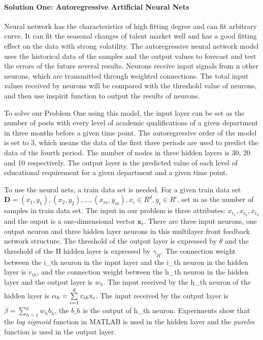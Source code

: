 \documentclass{mcmthesis}
\begin{document}
\paragraph{Solution One: Autoregressive Artificial Neural Nets }
\par\noindent
\par\noindent
Neural network has the characteristics of high fitting degree and can fit arbitrary curve. It can fit the seasonal changes of talent market well and has a good fitting effect on the data with strong volatility. The autoregressive neural network model uses the historical data of the samples and the output values to forecast and test the errors of the future several results. Neurons receive input signals from n other neurons, which are transmitted through weighted connections. The total input values received by neurons will be compared with the threshold value of neurons, and then use inspirit function to output the results of neurons. \par\noindent
To solve our Problem One using this model, the input layer can be set as the number of posts with every level of academic qualifications of a given department in three months before a given time point. The autoregressive order of the model is set to 3, which means the data of the first three periods are used to predict the data of the fourth period. The number of nodes in three hidden layers is 30, 20 and 10 respectively. The output layer is the predicted value of each level of educational requirement for a given department and a given time point.
\par\noindent
To use the neural nets, a train data set is needed.
For a given train data set $ \textbf{D} ={(x_1,y_1),(x_2,y_2),...,(x_m,y_m)},x_i \in R^d, y_i \in R^i$, set m as the number of samples in train data set. The input in our problem is three attributes: $x_{t_1},x_{t_2},x_{t_3}$ and the ouput is a one-dimensional vector $\textbf{x}_t$. There are three input neurons, one output neuron and three hidden layer neurons in this multilayer front feedback network structure. The threshold of the output layer is expressed by $\theta$ and the threshold of the H hidden layer is expressed by $\gamma_H$. The connection weight between the i\_th neuron in the input layer and the i\_th neuron in the hidden layer is $v_{ih}$, and the connection weight between the h\_th neuron in the hidden layer and the output layer is $w_h$. The input received by the h\_th neuron of the hidden layer is $\alpha_h = \sum\limits_{i = 1}^d {{v_{ih}}{{\rm{x}}_i}}$. The input received by the output layer is $\beta  = \sum\limits_{h = 1}^q {{w_h}{b_h}}$, the $b\_h$ is the output of h\_th neuron. Experiments show that the \textit{log sigmoid} function in MATLAB is used in the hidden layer and the \textit{purelin} function is used in the output layer.
\end{document}
